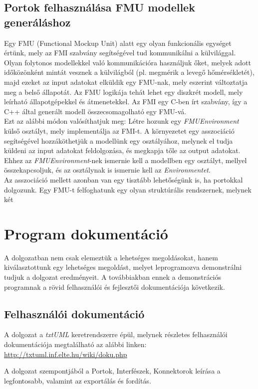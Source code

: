 \documentclass[a4paper,12pt]{report}
\begin{document}
\section{Portok felhasználása FMU modellek generáláshoz}
Egy FMU (Functional Mockup Unit) alatt egy olyan funkcionális egységet értünk, mely az FMI szabvány segítségével tud kommunikálni a külvilággal. Olyan folytonos modellekkel való kommunikációra használjuk őket, melyek adott időközönként mintát vesznek a külvilágból (pl. megmérik a levegő hőmérsékletét), majd ezeket az input adatokat elküldik egy FMU-nak, mely eszerint változtatja meg a belső állapotát. Az FMU logikája tehát lehet egy diszkrét modell, mely leírható állapotgépekkel és átmenetekkel. Az FMI egy C-ben írt szabvány, így a C++ által generált modell összecsomagolható egy FMU-vá. \\
Ezt az alábbi módon valósíthatjuk meg: Létre hozunk egy \textit{FMUEnvironment} külső osztályt, mely implementálja az FMI-t. A környezetet egy asszociáció segítségével hozzáköthetjük a modellünk egy osztályához, melynek el tudja küldeni az input adatokat feldolgozása, és megkapja tőle az output adatokat. Ehhez az \textit{FMUEnvironment}-nek ismernie kell a modellben egy osztályt, mellyel összekapcsoljuk, és az osztálynak is ismernie kell az \textit{Environmentet}.   \\
Az asszociáció mellett azonban van egy tisztább lehetőségünk is, ha portokkal dolgozunk. Egy FMU-t felfoghatunk egy olyan struktúrális rendszernek, melynek két 

\chapter{Program dokumentáció}
A dolgozatban nem csak elemeztük a lehetséges megoldásokat, hanem kiválasztottunk egy lehetséges megoldást, melyet leprogramozva demonstrálni tudjuk a dolgozat eredményeit. A továbbiakban ennek a demonstrációs programnak a rövid felhasználói és fejlesztői dokumentációja következik.

\section{Felhasználói dokumentáció}
A dolgozat a \textit{txtUML} keretrendszerre épül, melynek részletes felhasználói dokumentációja megtalálható az alábbi linken: \url{http://txtuml.inf.elte.hu/wiki/doku.php}

A dolgozat szempontjából a Portok, Interfészek, Konnektorok leírása a legfontosabb, valamint az exportálás és fordítás.
\end{document}
